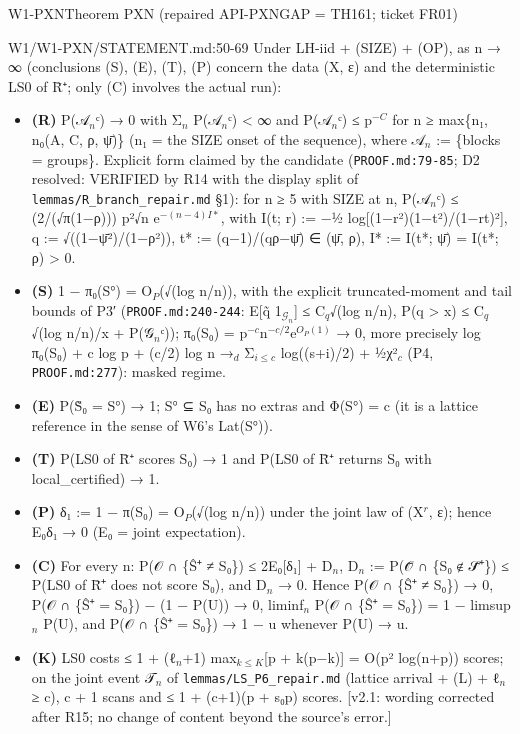 \begin{card}{W1-PXN}{Theorem PXN (repaired API-PXNGAP = TH161; ticket FR01)}
\begin{stmt}{W1/W1-PXN/STATEMENT.md:50-69}
Under LH-iid + (SIZE) + (OP), as n → ∞ (conclusions (S), (E), (T), (P) concern the data (X, ε) and the deterministic
LS0 of R̄⁺; only (C) involves the actual run):
\begin{itemize}
\item \textbf{(R)} P(𝒜$_{n}$ᶜ) → 0 with Σ$_{n}$ P(𝒜$_{n}$ᶜ) < ∞ and P(𝒜$_{n}$ᶜ) ≤ p$^{-C}$ for n ≥ max\{n₁, n₀(A, C, ρ, ψ̄)\} (n₁ = the SIZE onset of the sequence), where 𝒜$_{n}$ := \{blocks = groups\}.
  Explicit form claimed by the candidate (\texttt{PROOF.md:79-85}; D2 resolved: VERIFIED by R14 with the display split of \texttt{lemmas/R\_branch\_repair.md} §1): for n ≥ 5 with SIZE at n,
  P(𝒜$_{n}$ᶜ) ≤ (2/(√π(1−ρ))) p²√n e$^{-(n-4)I*}$, with I(t; r) := −½ log[(1−r²)(1−t²)/(1−rt)²],
  q := √((1−ψ̄²)/(1−ρ²)), t* := (q−1)/(qρ−ψ̄) ∈ (ψ̄, ρ), I* := I(t*; ψ̄) = I(t*; ρ) > 0.
\item \textbf{(S)} 1 − π₀(S°) = O$_{P}$(√(log n/n)), with the explicit truncated-moment and tail bounds of P3′ (\texttt{PROOF.md:240-244}:
  E[q̃ 1$_{\mathcal{G}_{n}}$] ≤ C$_{q}$√(log n/n), P(q > x) ≤ C$_{q}$√(log n/n)/x + P(𝒢$_{n}$ᶜ)); π₀(S₀) = p$^{-c}$n$^{-c/2}$e$^{O_{P}(1)}$ → 0, more precisely
  log π₀(S₀) + c log p + (c/2) log n →$_{d}$ Σ$_{i\le c}$ log((s+i)/2) + ½χ²$_{c}$ (P4, \texttt{PROOF.md:277}): masked regime.
\item \textbf{(E)} P(S̃₀ = S°) → 1; S° ⊆ S₀ has no extras and Φ(S°) = c (it is a lattice reference in the sense of W6's Lat(S°)).
\item \textbf{(T)} P(LS0 of R̄⁺ scores S₀) → 1 and P(LS0 of R̄⁺ returns S₀ with local\_certified) → 1.
\item \textbf{(P)} δ₁ := 1 − π(S₀) = O$_{P}$(√(log n/n)) under the joint law of (X$^{r}$, ε); hence E₀δ₁ → 0 (E₀ = joint expectation).
\item \textbf{(C)} For every n: P(𝒪 ∩ \{Ŝ⁺ ≠ S₀\}) ≤ 2E₀[δ₁] + D$_{n}$, D$_{n}$ := P(𝒪̄ ∩ \{S₀ ∉ 𝒮̄⁺\}) ≤ P(LS0 of R̄⁺ does not score S₀),
  and D$_{n}$ → 0. Hence P(𝒪 ∩ \{Ŝ⁺ ≠ S₀\}) → 0, P(𝒪 ∩ \{Ŝ⁺ = S₀\}) − (1 − P(U)) → 0, liminf$_{n}$ P(𝒪 ∩ \{Ŝ⁺ = S₀\}) =
  1 − limsup$_{n}$ P(U), and P(𝒪 ∩ \{Ŝ⁺ = S₀\}) → 1 − u whenever P(U) → u.
\item \textbf{(K)} LS0 costs ≤ 1 + (ℓ$_{n}$+1) max$_{k\le K}$[p + k(p−k)] = O(p² log(n+p)) scores; on the joint event 𝒯$_{n}$ of \texttt{lemmas/LS\_P6\_repair.md} (lattice arrival + (L) + ℓ$_{n}$ ≥ c), c + 1 scans
  and ≤ 1 + (c+1)(p + s₀p) scores. [v2.1: wording corrected after R15; no change of content beyond the source's error.]
\end{itemize}
\end{stmt}

\end{card}
